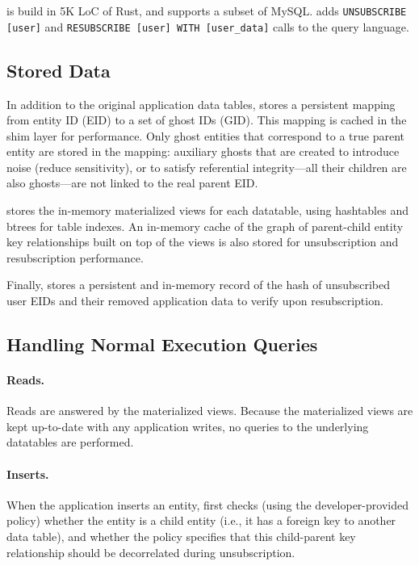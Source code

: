 \name is build in 5K LoC of Rust, and supports a subset of MySQL. \name adds \texttt{UNSUBSCRIBE
[user]} and \texttt{RESUBSCRIBE [user] WITH [user\_data]} calls to the query language.

\subsection{Stored Data}
In addition to the original application data tables, \name stores a persistent mapping from entity
ID (EID) to a set of ghost IDs (GID). This mapping is cached in the shim layer for performance. Only
ghost entities that correspond to a true parent entity are stored in the mapping: auxiliary ghosts that are
created to introduce noise (reduce sensitivity), or to satisfy referential integrity---all their
children are also ghosts---are not linked to the real parent EID.

\name stores the in-memory materialized views for each datatable, using hashtables and btrees for
table indexes. An in-memory cache of the graph of parent-child entity key relationships built on
top of the views is also stored for unsubscription and resubscription performance.

Finally, \name stores a persistent and in-memory record of the hash of unsubscribed user EIDs
and their removed application data to verify upon resubscription.

\subsection{Handling Normal Execution Queries}
\paragraph{Reads.}
Reads are answered by the materialized views. Because the materialized views are kept up-to-date with any application
writes, no queries to the underlying datatables are performed.

\paragraph{Inserts.}
When the application inserts an entity, \name first checks (using the developer-provided policy)
whether the entity is a child entity (i.e., it has a foreign key to another data table), and
whether the policy specifies that this child-parent key relationship should be decorrelated during
unsubscription.

